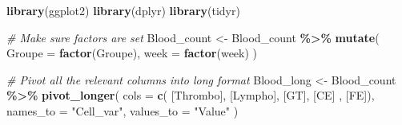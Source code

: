\documentclass[
]{article}
\newenvironment{Shaded}{\begin{snugshade}}{\end{snugshade}}
\newcommand{\AttributeTok}[1]{\textcolor[rgb]{0.13,0.29,0.53}{#1}}
\newcommand{\CommentTok}[1]{\textcolor[rgb]{0.56,0.35,0.01}{\textit{#1}}}
\newcommand{\FunctionTok}[1]{\textcolor[rgb]{0.13,0.29,0.53}{\textbf{#1}}}
\newcommand{\NormalTok}[1]{#1}
\newcommand{\OtherTok}[1]{\textcolor[rgb]{0.56,0.35,0.01}{#1}}
\newcommand{\SpecialCharTok}[1]{\textcolor[rgb]{0.81,0.36,0.00}{\textbf{#1}}}
\newcommand{\StringTok}[1]{\textcolor[rgb]{0.31,0.60,0.02}{#1}}
\begin{document}
\begin{Shaded}
\begin{Highlighting}[]
\FunctionTok{library}\NormalTok{(ggplot2)}
\FunctionTok{library}\NormalTok{(dplyr)}
\FunctionTok{library}\NormalTok{(tidyr)}

\CommentTok{\# Make sure factors are set}
\NormalTok{Blood\_count }\OtherTok{\textless{}{-}}\NormalTok{ Blood\_count }\SpecialCharTok{\%\textgreater{}\%}
  \FunctionTok{mutate}\NormalTok{(}
    \AttributeTok{Groupe =} \FunctionTok{factor}\NormalTok{(Groupe),}
    \AttributeTok{week =} \FunctionTok{factor}\NormalTok{(week)}
\NormalTok{  )}

\CommentTok{\# Pivot all the relevant columns into long format}
\NormalTok{Blood\_long }\OtherTok{\textless{}{-}}\NormalTok{ Blood\_count }\SpecialCharTok{\%\textgreater{}\%}
  \FunctionTok{pivot\_longer}\NormalTok{(}
    \AttributeTok{cols =} \FunctionTok{c}\NormalTok{( }\StringTok{\textasciigrave{}}\AttributeTok{[Thrombo]}\StringTok{\textasciigrave{}}\NormalTok{, }\StringTok{\textasciigrave{}}\AttributeTok{[Lympho]}\StringTok{\textasciigrave{}}\NormalTok{, }\StringTok{\textasciigrave{}}\AttributeTok{[GT]}\StringTok{\textasciigrave{}}\NormalTok{, }\StringTok{\textasciigrave{}}\AttributeTok{[CE]}\StringTok{\textasciigrave{}}\NormalTok{ , }\StringTok{\textasciigrave{}}\AttributeTok{[FE]}\StringTok{\textasciigrave{}}\NormalTok{),}
    \AttributeTok{names\_to =} \StringTok{"Cell\_var"}\NormalTok{,}
    \AttributeTok{values\_to =} \StringTok{"Value"}
\NormalTok{  )}


\end{Highlighting}
\end{Shaded}
\end{document}
